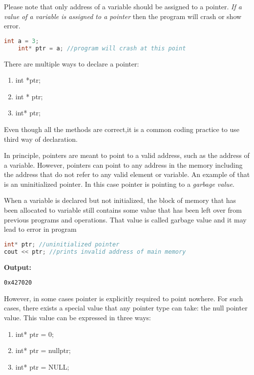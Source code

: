 \documentclass[11pt,fleqn]{book} %
\begin{document}
\begin{tcolorbox}[width=\textwidth,colback={white},title={KEYNOTE},colbacktitle=purple!50!white,coltitle=black]    
	Please note that only address of a variable should be assigned to a pointer. \emph{If a value of a variable is assigned to a pointer} then the program will crash or show error.

	\begin{lstlisting}[language=C++, caption = Incorrect initialization of a pointer]
	int a = 3;
	int* ptr = a; //program will crash at this point
	\end{lstlisting}
 
	\hfill \break
	There are multiple ways to declare a pointer:
	\begin{enumerate}
		\item int *ptr;
		\item int * ptr;
		\item int* ptr;
	\end{enumerate}
	Even though all the methods are correct,it is a common coding practice to use third way of declaration.
\end{tcolorbox}

\hfill \break
In principle, pointers are meant to point to a valid address, such as the address of a variable. However, pointers can point to any address in the memory including the address that do not refer to any valid element or variable. An example of that is an uninitialized pointer. In this case pointer is pointing to a \emph{garbage value}. \\

\begin{definition}
	When a variable is declared but not initialized, the block of memory that has been allocated to variable still contains some value that has been left over from previous programs and operations. That value is called garbage value and it may lead to error in program
\end{definition}


\begin{lstlisting}[language=C++, caption = Un-initialize pointer]
int* ptr; //uninitialized pointer
cout << ptr; //prints invalid address of main memory
\end{lstlisting}
\textbf{Output:}
\begin{lstlisting}
0x427020 
\end{lstlisting}

 
\hfill \break
However, in some cases pointer is explicitly required to point nowhere. For such cases, there exists a special value that any pointer type can take: the null pointer value. This value can be expressed in three ways:
 \begin{enumerate}
 	\item int* ptr = 0;
 	\item int* ptr = nullptr;
 	\item int* ptr = NULL;
 \end{enumerate}
 
\end{document}
